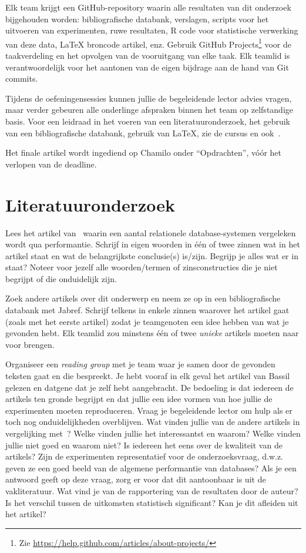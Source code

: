 \documentclass[fleqn,10pt]{voorstel}
\begin{document}
Elk team krijgt een GitHub-repository waarin alle resultaten van dit onderzoek bijgehouden worden: bibliografische databank, verslagen, scripts voor het uitvoeren van experimenten, ruwe resultaten, R code voor statistische verwerking van deze data, {\LaTeX} broncode artikel, enz. Gebruik GitHub Projects\footnote{Zie \url{https://help.github.com/articles/about-projects/}} voor de taakverdeling en het opvolgen van de vooruitgang van elke taak. Elk teamlid is verantwoordelijk voor het aantonen van de eigen bijdrage aan de hand van Git commits. 

Tijdens de oefeningensessies kunnen jullie de begeleidende lector advies vragen, maar verder gebeuren alle onderlinge afspraken binnen het team op zelfstandige basis. Voor een leidraad in het voeren van een literatuuronderzoek, het gebruik van een bibliografische databank, gebruik van \LaTeX{}, zie de cursus en ook~\textcite{VanVreckem2017}.

Het finale artikel wordt ingediend op Chamilo onder ``Opdrachten'', vóór het verlopen van de deadline.


\section{Literatuuronderzoek}

Lees het artikel van~\textcite{Bassil2012} waarin een aantal relationele database-systemen vergeleken wordt qua performantie. Schrijf in eigen woorden in één of twee zinnen wat in het artikel staat en wat de belangrijkste conclusie(s) is/zijn. Begrijp je alles wat er in staat? Noteer voor jezelf alle woorden/termen of zinsconstructies die je niet begrijpt of die onduidelijk zijn.

Zoek andere artikels over dit onderwerp en neem ze op in een bibliografische databank met Jabref. Schrijf telkens in enkele zinnen waarover het artikel gaat (zoals met het eerste artikel) zodat je teamgenoten een idee hebben van wat je gevonden hebt. Elk teamlid zou minstens één of twee \emph{unieke} artikels moeten naar voor brengen.

Organiseer een \emph{reading group} met je team waar je samen door de gevonden teksten gaat en die bespreekt. Je hebt vooraf in elk geval het artikel van Bassil gelezen en datgene dat je zelf hebt aangebracht. De bedoeling is dat iedereen de artikels ten gronde begrijpt en dat jullie een idee vormen van hoe jullie de experimenten moeten reproduceren. Vraag je begeleidende lector om hulp als er toch nog onduidelijkheden overblijven. Wat vinden jullie van de andere artikels in vergelijking met~\textcite{Bassil2012}? Welke vinden jullie het interessantst en waarom? Welke vinden jullie niet goed en waarom niet? Is iedereen het eens over de kwaliteit van de artikels? Zijn de experimenten representatief voor de onderzoeksvraag, d.w.z. geven ze een goed beeld van de algemene performantie van databases? Als je een antwoord geeft op deze vraag, zorg er voor dat dit aantoonbaar is uit de vakliteratuur. Wat vind je van de rapportering van de resultaten door de auteur? Is het verschil tussen de uitkomsten statistisch significant? Kan je dit afleiden uit het artikel?
\end{document}
